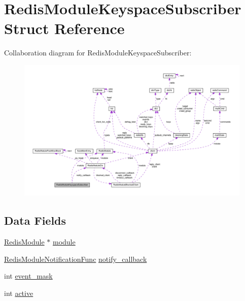 \hypertarget{struct_redis_module_keyspace_subscriber}{}\section{Redis\+Module\+Keyspace\+Subscriber Struct Reference}
\label{struct_redis_module_keyspace_subscriber}


Collaboration diagram for Redis\+Module\+Keyspace\+Subscriber\+:
\nopagebreak
\begin{figure}[H]
\begin{center}
\leavevmode
\includegraphics[width=350pt]{struct_redis_module_keyspace_subscriber__coll__graph}
\end{center}
\end{figure}
\subsection*{Data Fields}
\begin{DoxyCompactItemize}
\item 
\hyperlink{struct_redis_module}{Redis\+Module} $\ast$ \hyperlink{struct_redis_module_keyspace_subscriber_a9b71e67bccc12e40caf1d263db4172f3}{module}
\item 
\hyperlink{redismodule_8h_a74883ef8943753c7246ef4eb46516187}{Redis\+Module\+Notification\+Func} \hyperlink{struct_redis_module_keyspace_subscriber_aac2bf0df8a745e43f3f56fe2dbb67d93}{notify\+\_\+callback}
\item 
int \hyperlink{struct_redis_module_keyspace_subscriber_a8508889ea038e3b65f84b66ee2e94219}{event\+\_\+mask}
\item 
int \hyperlink{struct_redis_module_keyspace_subscriber_aa5805c5e936174e5092bf7a5b78e7e64}{active}
\end{DoxyCompactItemize}


